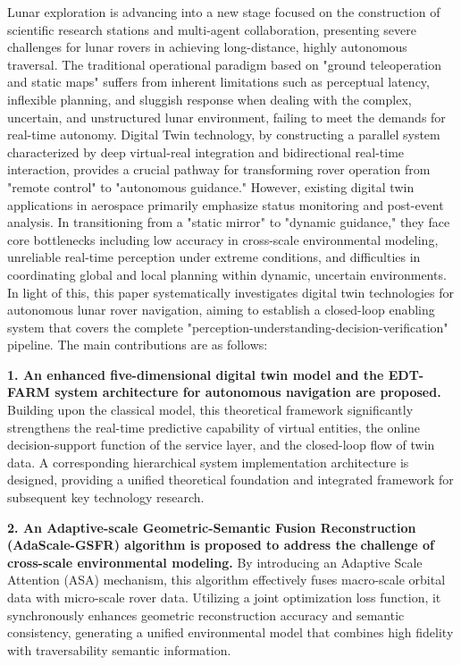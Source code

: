 Lunar exploration is advancing into a new stage focused on the construction of scientific research stations and multi-agent collaboration, presenting severe challenges for lunar rovers in achieving long-distance, highly autonomous traversal. The traditional operational paradigm based on "ground teleoperation and static maps" suffers from inherent limitations such as perceptual latency, inflexible planning, and sluggish response when dealing with the complex, uncertain, and unstructured lunar environment, failing to meet the demands for real-time autonomy. Digital Twin technology, by constructing a parallel system characterized by deep virtual-real integration and bidirectional real-time interaction, provides a crucial pathway for transforming rover operation from "remote control" to "autonomous guidance." However, existing digital twin applications in aerospace primarily emphasize status monitoring and post-event analysis. In transitioning from a "static mirror" to "dynamic guidance," they face core bottlenecks including low accuracy in cross-scale environmental modeling, unreliable real-time perception under extreme conditions, and difficulties in coordinating global and local planning within dynamic, uncertain environments. In light of this, this paper systematically investigates digital twin technologies for autonomous lunar rover navigation, aiming to establish a closed-loop enabling system that covers the complete "perception-understanding-decision-verification" pipeline. The main contributions are as follows:

\textbf{1. An enhanced five-dimensional digital twin model and the EDT-FARM system architecture for autonomous navigation are proposed.} Building upon the classical model, this theoretical framework significantly strengthens the real-time predictive capability of virtual entities, the online decision-support function of the service layer, and the closed-loop flow of twin data. A corresponding hierarchical system implementation architecture is designed, providing a unified theoretical foundation and integrated framework for subsequent key technology research.

\textbf{2. An Adaptive-scale Geometric-Semantic Fusion Reconstruction (AdaScale-GSFR) algorithm is proposed to address the challenge of cross-scale environmental modeling.} By introducing an Adaptive Scale Attention (ASA) mechanism, this algorithm effectively fuses macro-scale orbital data with micro-scale rover data. Utilizing a joint optimization loss function, it synchronously enhances geometric reconstruction accuracy and semantic consistency, generating a unified environmental model that combines high fidelity with traversability semantic information.

